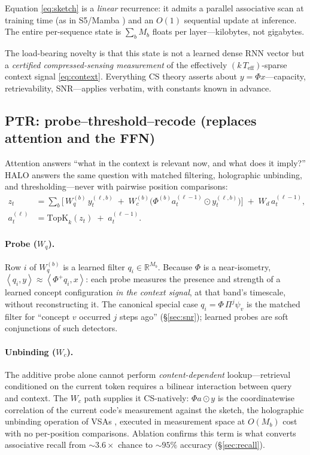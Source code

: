 \documentclass[11pt]{article}
\newcommand{\R}{\mathbb{R}}
\newcommand{\inner}[2]{\left\langle #1, #2 \right\rangle}
\newcommand{\topk}{\mathrm{TopK}}
\begin{document}
Equation \eqref{eq:sketch} is a \emph{linear} recurrence: it admits a parallel associative scan at training time (as in S5/Mamba \citep{smith2023s5,gu2023mamba}) and an $O(1)$ sequential update at inference. The entire per-sequence state is $\sum_b M_b$ floats per layer---kilobytes, not gigabytes.

The load-bearing novelty is that this state is not a learned dense RNN vector but a \emph{certified compressed-sensing measurement} of the effectively $(k\,T_{\mathrm{eff}})$-sparse context signal \eqref{eq:context}. Everything CS theory asserts about $y = \Phi x$---capacity, retrievability, SNR---applies verbatim, with constants known in advance.

\subsection{PTR: probe--threshold--recode (replaces attention and the FFN)}
\label{sec:ptr}

Attention answers ``what in the context is relevant now, and what does it imply?'' HALO answers the same question with matched filtering, holographic unbinding, and thresholding---never with pairwise position comparisons:
\begin{align}
z_t &= \sum_b \Big[\, W_q^{(b)}\, y_t^{(\ell,b)} \;+\; W_c^{(b)} \big( \Phi^{(b)} a_t^{(\ell-1)} \odot y_t^{(\ell,b)} \big) \Big] \;+\; W_d\, a_t^{(\ell-1)} , \label{eq:probe}\\
a_t^{(\ell)} &= \topk_k(z_t) \;+\; a_t^{(\ell-1)} . \label{eq:recode}
\end{align}

\paragraph{Probe ($W_q$).} Row $i$ of $W_q^{(b)}$ is a learned filter $q_i \in \R^{M_b}$. Because $\Phi$ is a near-isometry, $\inner{q_i}{y} \approx \inner{\Phi^{+} q_i}{x}$: each probe measures the presence and strength of a learned concept configuration \emph{in the context signal}, at that band's timescale, without reconstructing it. The canonical special case $q_i = \Phi\, \Pi^{j} \psi_v$ is the matched filter for ``concept $v$ occurred $j$ steps ago'' (\S\ref{sec:snr}); learned probes are soft conjunctions of such detectors.

\paragraph{Unbinding ($W_c$).} The additive probe alone cannot perform \emph{content-dependent} lookup---retrieval conditioned on the current token requires a bilinear interaction between query and context. The $W_c$ path supplies it CS-natively: $\Phi a \odot y$ is the coordinatewise correlation of the current code's measurement against the sketch, the holographic unbinding operation of VSAs \citep{plate1995holographic}, executed in measurement space at $O(M_b)$ cost with no per-position comparisons. Ablation confirms this term is what converts associative recall from ${\sim}3.6{\times}$ chance to ${\sim}95\%$ accuracy (\S\ref{sec:recall}).
\end{document}

